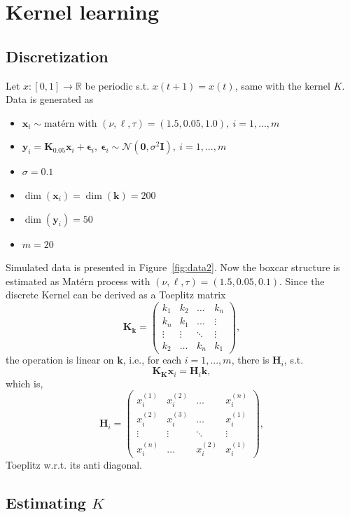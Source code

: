 \documentclass[times, a4paper, 12pt, onecolumn, oneside]{article}
\newcommand{\bm}{\boldsymbol}
\begin{document}
\section{Kernel learning}

\subsection{Discretization}

Let $x: [0, 1] \rightarrow \mathbb{R}$ be periodic s.t. $x(t+1) = x(t)$, same with the kernel $K$. Data is generated as
\begin{itemize}
\item $\bm{x}_i \sim \text{matérn with } (\nu, \ell, \tau) = (1.5, 0.05, 1.0), ~ i=1,...,m$
\item $\bm{y}_i = \bm{K}_{0.05} \bm{x}_i + \bm{\epsilon}_i, ~ \bm{\epsilon}_i \sim \mathcal{N}(\bm{0}, \sigma^2\bm{I}), ~ i = 1,...,m$
\item $\sigma = 0.1$
\item $\dim(\bm{x}_i) = \dim(\bm{k}) = 200$
\item $\dim(\bm{y}_i) = 50$
\item $m=20$ 
\end{itemize}
Simulated data is presented in Figure~\ref{fig:data2}. Now the boxcar structure is estimated as Matérn process with $(\nu, \ell, \tau) = (1.5, 0.05, 0.1)$. Since the discrete Kernel can be derived as a Toeplitz matrix
$$
\bm{K}_{\bm{k}} =
\begin{pmatrix}
k_1 & k_2 & \dots & k_n \\
k_n & k_1 & \dots & \vdots \\
\vdots & \vdots & \ddots & \vdots \\
k_2 & \dots & k_n & k_1
\end{pmatrix},
$$
the operation is linear on $\bm{k}$, i.e., for each $i=1,...,m$, there is $\bm{H}_i$, s.t.
$$
\bm{K}_{\bm{K}} \bm{x}_i = \bm{H}_i \bm{k},
$$
which is,
$$
\bm{H}_i =
\begin{pmatrix}
x_i^{(1)} & x_i^{(2)} & \dots & x_i^{(n)} \\
x_i^{(2)} & x_i^{(3)} & \dots & x_i^{(1)} \\
\vdots & \vdots & \ddots & \vdots \\
x_i^{(n)} & \dots & x_i^{(2)} & x_i^{(1)}
\end{pmatrix},
$$
Toeplitz w.r.t. its anti diagonal.

\subsection{Estimating $K$}
\end{document}
